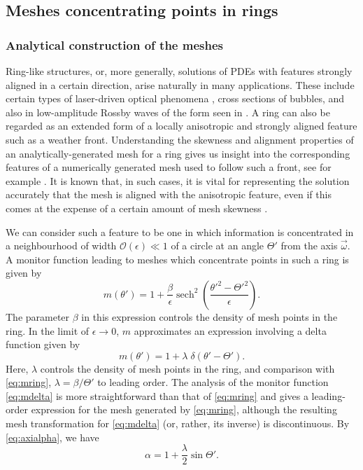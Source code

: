 \documentclass[11pt, a4paper]{scrartcl}  %
\theoremstyle{plain}
\theoremstyle{definition}
\numberwithin{equation}{section}
\DeclareMathOperator{\sech}{sech}
\begin{document}
\subsection{Meshes concentrating points in rings}

\subsubsection{Analytical construction of the meshes}

Ring-like structures, or, more generally, solutions of PDEs with
features strongly aligned in a certain direction, arise naturally in
many applications. These include certain types of laser-driven optical
phenomena \citep{fibich2015nonlinear}, cross sections of bubbles, and
also in low-amplitude Rossby waves of the form seen in
\citet{slingo2009developing}. A ring can also be regarded as an extended
form of a locally anisotropic and strongly aligned feature such as a
weather front. Understanding the skewness and alignment properties of an
analytically-generated mesh for a ring gives us insight into the
corresponding features of a numerically generated mesh used to follow
such a front, see for example \citet{budd2013monge}. It is known that,
in such cases, it is vital for representing the solution accurately that
the mesh is aligned with the anisotropic feature, even if this comes at
the expense of a certain amount of mesh skewness
\citep{huang2011adaptive}.

We can consider such a feature to be one in which information is
concentrated in a neighbourhood of width $\mathcal{O}(\epsilon) \ll 1$
of a circle at an angle $\Theta'$ from the axis $\vec{\omega}$. A
monitor function leading to meshes which concentrate points in such a
ring is given by
\begin{equation}
\label{eq:mring}
m(\theta') = 1 + \frac{\beta}{\epsilon} \sech^2\left(\frac{\theta'^2 - \Theta'^2}{\epsilon}\right).
\end{equation}
The parameter $\beta$ in this expression controls the density of mesh
points in the ring. In the limit of $\epsilon \to 0$, $m$ approximates
an expression involving a delta function given by
\begin{equation}
\label{eq:mdelta}
m(\theta') = 1 + \lambda \; \delta(\theta' - \Theta').
\end{equation}
Here, $\lambda$ controls the density of mesh points in the ring, and
comparison with \cref{eq:mring}, ${\lambda = \beta /\Theta'}$ to leading
order. The analysis of the monitor function \cref{eq:mdelta} is
more straightforward than that of \cref{eq:mring} and gives a
leading-order expression for the mesh generated by \cref{eq:mring},
although the resulting mesh transformation for \cref{eq:mdelta} (or,
rather, its inverse) is discontinuous. By \cref{eq:axialpha}, we have
\begin{equation}
\label{eq:deltaalpha}
\alpha = 1 + \frac{\lambda}{2} \sin\Theta'.
\end{equation}
\end{document}
